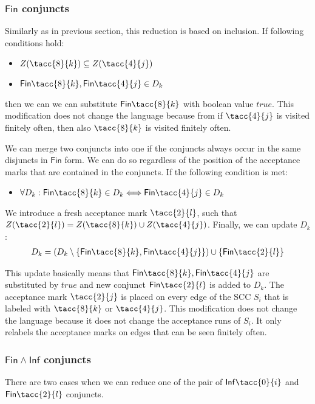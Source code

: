 \documentclass[runningheads]{llncs}
\def\Inf{\ensuremath{\mathsf{Inf}}}
\def\Fin{\ensuremath{\mathsf{Fin}}}
\def\true{\mathit{true}}
\begin{document}
\subsubsection{$\Fin$ conjuncts\\}
Similarly as in previous section, this reduction is based on inclusion.
If following conditions hold:
\begin{itemize}
    \item $Z(\tacc{8}{k}) \subseteq Z(\tacc{4}{j})$
    \item $\Fin\tacc{8}{k}, \Fin\tacc{4}{j} \in D_{k}$
\end{itemize}
then we can we can substitute $\Fin\tacc{8}{k}$ with boolean value $\true$. This modification does not change the language because from if $\tacc{4}{j}$ is visited finitely often, then also $\tacc{8}{k}$ is visited finitely often. 
\medskip

We can merge two conjuncts into one if the conjuncts always occur in the same disjuncts in $\Fin$ form. We can do so regardless of the position of the acceptance marks that are contained in the conjuncts. 
If the following condition is met:
\begin{itemize}
    \item $\forall D_{k}: \Fin\tacc{8}{k} \in D_{k} \Longleftrightarrow \Fin\tacc{4}{j} \in D_{k}$
\end{itemize}
We introduce a fresh acceptance mark $\tacc{2}{l}$, such that $Z(\tacc{2}{l}) = Z(\tacc{8}{k}) \cup Z(\tacc{4}{j})$.
 Finally, we can update $D_{k}$:
\begin{align*}
    D_{k} = (D_{k} \setminus \{ \Fin\tacc{8}{k}, \Fin\tacc{4}{j} \}) \cup \{\Fin\tacc{2}{l}\}
\end{align*}

This update basically means that $\Fin\tacc{8}{k}, \Fin\tacc{4}{j}$ are substituted by $\true$ and new conjunct $\Fin\tacc{2}{l}$ is added to $D_{k}$. The acceptance mark $\tacc{2}{j}$ is placed on every edge of the SCC $S_{i}$ that is labeled with $\tacc{8}{k}$ or $\tacc{4}{j}$.
This modification does not change the language because it does not change the acceptance runs of $S_{i}$. It only relabels the acceptance marks on edges that can be seen finitely often. 



\subsubsection{$\Fin \land \Inf$ conjuncts\\}
There are two cases when we can reduce one of the pair of $\Inf\tacc{0}{i}$ and $\Fin\tacc{2}{l}$ conjuncts.
\end{document}
